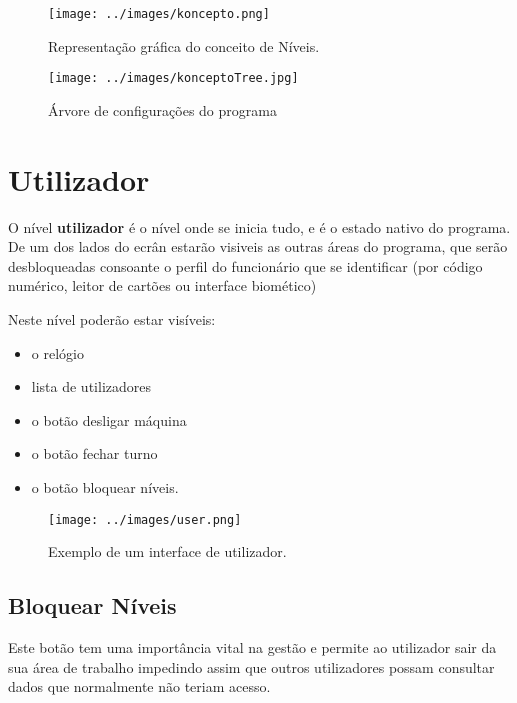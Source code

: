 \documentclass[a4paper,11pt,openany]{memoir}
\begin{document}
                 


\begin{figure}
\texttt{[image: ../images/koncepto.png]}
\caption[Submanifold]{Representação gráfica do conceito de Níveis.}
\end{figure}

\begin{figure}
\texttt{[image: ../images/konceptoTree.jpg]}
\caption[Submanifold]{Árvore de configurações do programa}
\end{figure}




\chapter{Utilizador} 

O nível \textbf{utilizador} é o nível onde se inicia tudo, e é o estado nativo do programa.
De um dos lados do ecrân estarão visiveis as outras áreas do programa, que serão desbloqueadas 
consoante o perfil do funcionário que se identificar (por código numérico, leitor de cartões ou interface biomético)

Neste nível poderão estar visíveis:
\begin{itemize}
\item o relógio
\item lista de utilizadores
\item o botão desligar máquina
\item o botão fechar turno
\item o botão bloquear níveis.
\end{itemize}
\begin{figure}
\texttt{[image: ../images/user.png]}
\caption[Submanifold]{Exemplo de um interface de utilizador.}
\end{figure}

\section{Bloquear Níveis}

Este botão tem uma importância vital na gestão e permite ao utilizador sair da sua área de trabalho
impedindo assim que outros utilizadores possam consultar dados que normalmente não teriam acesso.
\end{document}

